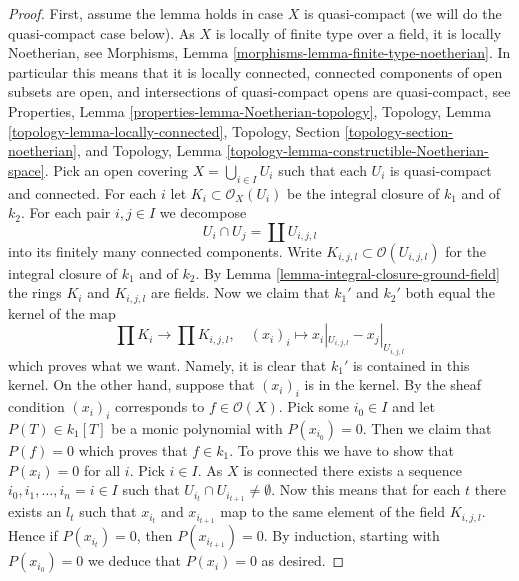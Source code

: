 \begin{proof}
First, assume the lemma holds in case $X$ is quasi-compact (we will
do the quasi-compact case below).
As $X$ is locally of finite type over a field, it is locally Noetherian, see
Morphisms, Lemma \ref{morphisms-lemma-finite-type-noetherian}.
In particular this means that it is locally connected,
connected components of open subsets are open, and
intersections of quasi-compact opens are quasi-compact, see
Properties, Lemma \ref{properties-lemma-Noetherian-topology},
Topology, Lemma \ref{topology-lemma-locally-connected},
Topology, Section \ref{topology-section-noetherian}, and
Topology, Lemma \ref{topology-lemma-constructible-Noetherian-space}.
Pick an open covering $X = \bigcup_{i \in I} U_i$
such that each $U_i$ is quasi-compact and connected.
For each $i$ let $K_i \subset \mathcal{O}_X(U_i)$ be the integral
closure of $k_1$ and of $k_2$.
For each pair $i, j \in I$ we decompose
$$
U_i \cap U_j = \coprod U_{i, j, l}
$$
into its finitely many connected components. Write
$K_{i, j, l} \subset \mathcal{O}(U_{i, j, l})$
for the integral closure of $k_1$ and of $k_2$. By
Lemma \ref{lemma-integral-closure-ground-field}
the rings $K_i$ and $K_{i, j, l}$ are fields.
Now we claim that $k_1'$ and $k_2'$ both equal the kernel of the map
$$
\prod K_i \longrightarrow \prod K_{i, j, l}, \quad
(x_i)_i \longmapsto x_i|_{U_{i, j, l}} - x_j|_{U_{i, j, l}}
$$
which proves what we want.
Namely, it is clear that $k_1'$ is contained in this kernel.
On the other hand, suppose that $(x_i)_i$ is in the kernel.
By the sheaf condition $(x_i)_i$ corresponds to $f \in \mathcal{O}(X)$.
Pick some $i_0 \in I$ and let $P(T) \in k_1[T]$ be a monic polynomial
with $P(x_{i_0}) = 0$. Then we claim that $P(f) = 0$ which proves
that $f \in k_1$. To prove this we have to show that $P(x_i) = 0$
for all $i$. Pick $i \in I$. As $X$ is connected there exists a
sequence $i_0, i_1, \ldots, i_n = i \in I$ such that
$U_{i_t} \cap U_{i_{t + 1}} \not = \emptyset$. Now this means that
for each $t$ there exists an $l_t$ such that $x_{i_t}$ and
$x_{i_{t + 1}}$ map to the same element of the field $K_{i, j, l}$.
Hence if $P(x_{i_t}) = 0$, then $P(x_{i_{t + 1}}) = 0$. By
induction, starting with $P(x_{i_0}) = 0$ we deduce that
$P(x_i) = 0$ as desired.


\end{proof}
